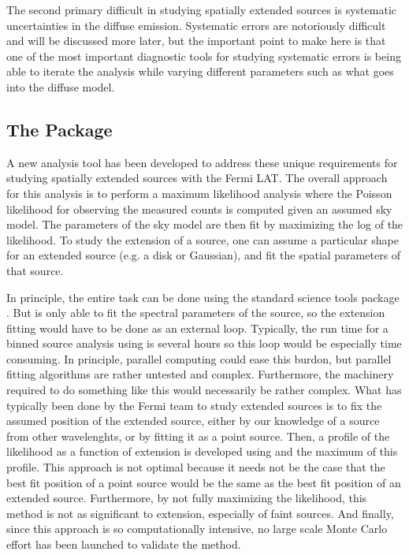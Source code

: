 \documentclass[preprint]{aastex}
\newcommand{\pointlike}{\text{\em pointlike}\xspace}
\newcommand{\gtlike}{\text{\em gtlike}\xspace}
\begin{document}
The second primary difficult in studying spatially extended sources is
systematic uncertainties in the diffuse emission. Systematic errors are
notoriously difficult and will be discussed more later, but the important
point to make here is that one of the most important diagnostic tools for
studying systematic errors is being able to iterate the analysis while
varying different parameters such as what goes into the diffuse model.

\subsection{The \pointlike Package}

A new analysis tool has been developed to address these unique
requirements for studying spatially extended sources with the Fermi
LAT. The overall approach for this analysis is to perform a maximum
likelihood analysis where the Poisson likelihood for observing the
measured counts is computed given an assumed sky model. The parameters
of the sky model are then fit by maximizing the log of the likelihood.
To study the extension of a source, one can assume a particular shape
for an extended source (e.g. a disk or Gaussian), and fit the spatial
parameters of that source.

In principle, the entire task can be done using the standard science
tools package \gtlike\cite{Science-Tools-gtlike}. But \gtlike is
only able to fit the spectral parameters of the source, so the extension
fitting would have to be done as an external loop. Typically, the run time
for a binned source analysis using \gtlike is several hours so this loop
would be especially time consuming. In principle, parallel computing could
ease this burdon, but parallel fitting algorithms are rather untested
and complex. Furthermore, the machinery required to do something like
this would necessarily be rather complex. What has typically been done by
the Fermi team to study extended sources is to fix the assumed position
of the extended source, either by our knowledge of a source from other
wavelenghts, or by fitting it as a point source. Then, a profile of the
likelihood as a function of extension is developed using \gtlike
and the maximum of this profile. This approach is not optimal because it
needs not be the case that the best fit position of a point source would
be the same as the best fit position of an extended source. Furthermore,
by not fully maximizing the likelihood, this method is not as significant to
extension, especially of faint sources. And finally, since this approach
is so computationally intensive, no large scale Monte Carlo effort has been
launched to validate the method.
\end{document}
